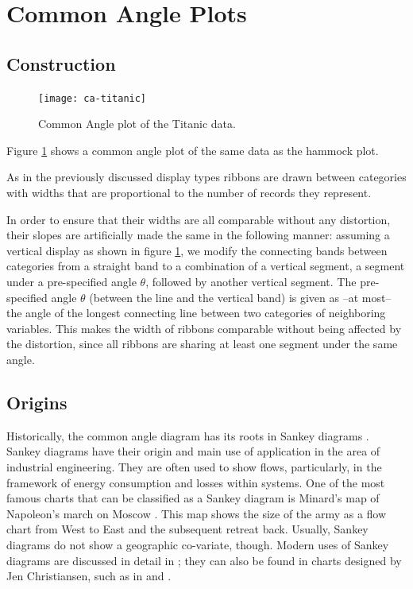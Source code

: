 \section{ Common Angle Plots}
\subsection{Construction}


\begin{figure}[htbp] %
   \centering
   \texttt{[image: ca-titanic]} 
   \caption{Common Angle plot of the Titanic data. }
   \label{fig:ca-titanic}
\end{figure}

Figure \ref{fig:ca-titanic} shows a common angle plot of the same data as the hammock plot.

As in the previously discussed display types ribbons are drawn between categories with widths  that are proportional to  the number of records they represent.

In order to ensure that their widths are all comparable without any distortion, their slopes  are artificially made the same in the following manner: 
assuming a vertical display as shown in figure \ref{fig:ca-titanic}, we modify  the connecting bands between  categories from a straight band  to a combination of a vertical  segment, a  segment under a pre-specified angle $\theta$, followed by another vertical  segment.  
The pre-specified angle $\theta$ (between the line and the vertical band) is given as --at most-- the angle of the longest connecting line between two categories of neighboring variables. 
This makes the width of ribbons  comparable without being affected by the distortion, since all ribbons are sharing at least one segment under the same angle. 

\subsection{Origins}
Historically, the common angle diagram has its roots in Sankey diagrams \citep{sankey:1898}. Sankey diagrams have their origin and main use of application in the area of industrial engineering. They are often used to show flows,  particularly, in the framework of energy consumption and losses within systems.
One of the most famous charts that can be classified as a Sankey diagram is Minard's map of Napoleon's march on Moscow \citep{minard:1812}. This map  shows the size of the army as a flow chart from West to East and the subsequent retreat back. Usually, Sankey diagrams do not show a geographic co-variate, though. Modern uses of Sankey diagrams are discussed in  detail in \citep{schmidt:2008};  they can also be found in charts designed by Jen Christiansen, such as in \cite{jen1} and \cite{jen2}.

